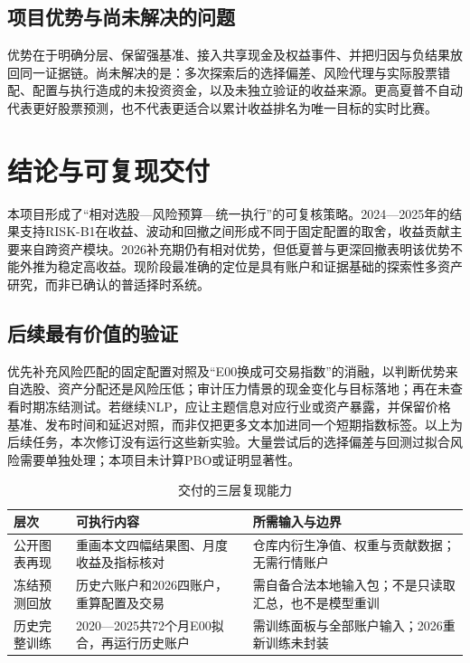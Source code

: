 \documentclass[11pt,a4paper]{article}
\begin{document}
\subsection{项目优势与尚未解决的问题}
优势在于明确分层、保留强基准、接入共享现金及权益事件、并把归因与负结果放回同一证据链。尚未解决的是：多次探索后的选择偏差、风险代理与实际股票错配、配置与执行造成的未投资资金，以及未独立验证的收益来源。更高夏普不自动代表更好股票预测，也不代表更适合以累计收益排名为唯一目标的实时比赛。

\clearpage
\section{结论与可复现交付}
本项目形成了“相对选股—风险预算—统一执行”的可复核策略。2024—2025年的结果支持RISK-B1在收益、波动和回撤之间形成不同于固定配置的取舍，收益贡献主要来自跨资产模块。2026补充期仍有相对优势，但低夏普与更深回撤表明该优势不能外推为稳定高收益。现阶段最准确的定位是具有账户和证据基础的探索性多资产研究，而非已确认的普适择时系统。

\subsection{后续最有价值的验证}
优先补充风险匹配的固定配置对照及“E00换成可交易指数”的消融，以判断优势来自选股、资产分配还是风险压低；审计压力情景的现金变化与目标落地；再在未查看时期冻结测试。若继续NLP，应让主题信息对应行业或资产暴露，并保留价格基准、发布时间和延迟对照，而非仅把更多文本加进同一个短期指数标签。以上为后续任务，本次修订没有运行这些新实验。大量尝试后的选择偏差与回测过拟合风险需要单独处理\cite{pbo}；本项目未计算PBO或证明显著性。

\begin{table}[htbp]\centering\small
\caption{交付的三层复现能力}\label{tab:reproduction}
\begin{tabular}{@{}p{2.7cm}p{5.7cm}p{5.9cm}@{}}\toprule
层次 & 可执行内容 & 所需输入与边界 \\\midrule
公开图表再现 & 重画本文四幅结果图、月度收益及指标核对 & 仓库内衍生净值、权重与贡献数据；无需行情账户 \\
冻结预测回放 & 历史六账户和2026四账户，重算配置及交易 & 需自备合法本地输入包；不是只读取汇总，也不是模型重训 \\
历史完整训练 & 2020—2025共72个月E00拟合，再运行历史账户 & 需训练面板与全部账户输入；2026重新训练未封装 \\
\bottomrule\end{tabular}\end{table}
\end{document}
